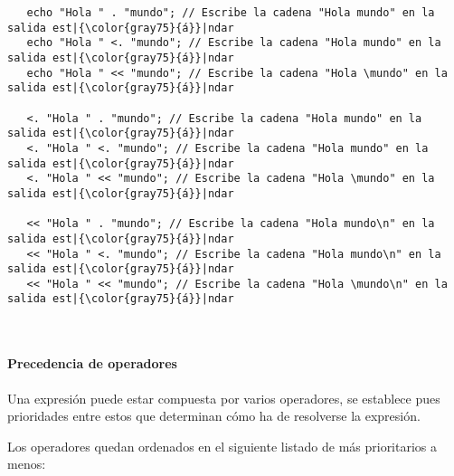\begin{lstlisting}
   echo "Hola " . "mundo"; // Escribe la cadena "Hola mundo" en la salida est|{\color{gray75}{á}}|ndar
   echo "Hola " <. "mundo"; // Escribe la cadena "Hola mundo" en la salida est|{\color{gray75}{á}}|ndar
   echo "Hola " << "mundo"; // Escribe la cadena "Hola \mundo" en la salida est|{\color{gray75}{á}}|ndar
   
   <. "Hola " . "mundo"; // Escribe la cadena "Hola mundo" en la salida est|{\color{gray75}{á}}|ndar
   <. "Hola " <. "mundo"; // Escribe la cadena "Hola mundo" en la salida est|{\color{gray75}{á}}|ndar
   <. "Hola " << "mundo"; // Escribe la cadena "Hola \mundo" en la salida est|{\color{gray75}{á}}|ndar
   
   << "Hola " . "mundo"; // Escribe la cadena "Hola mundo\n" en la salida est|{\color{gray75}{á}}|ndar
   << "Hola " <. "mundo"; // Escribe la cadena "Hola mundo\n" en la salida est|{\color{gray75}{á}}|ndar
   << "Hola " << "mundo"; // Escribe la cadena "Hola \mundo\n" en la salida est|{\color{gray75}{á}}|ndar
\end{lstlisting}
\hfill\\


\paragraph{Precedencia de operadores} \label{sec:op_pre}

Una expresión puede estar compuesta por varios operadores, se establece pues prioridades entre estos que determinan 
cómo ha de resolverse la expresión. 

Los operadores quedan ordenados en el siguiente listado de más prioritarios a menos:

